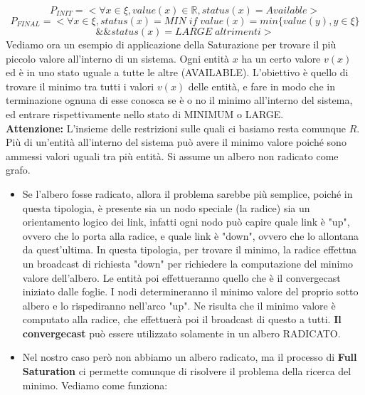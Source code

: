 $$P_{INIT} = < \forall x \in \xi, value(x) \in \mathbb{R}, status(x) =
    Available>$$
$$
    P_{FINAL} =   <
    \forall x \in \xi, status(x)= MIN \; if \; value(x) = min
    \{value(y), y \in \xi \}$$$$ \&\&  status(x) = LARGE \;altrimenti >$$
Vediamo ora un esempio di applicazione della Saturazione per trovare il più
piccolo valore all'interno di un sistema. Ogni entità $x$ ha un certo valore
$v(x)$ ed è in uno stato uguale a tutte le altre (AVAILABLE). L'obiettivo è
quello di trovare il minimo tra tutti i valori $v(x)$ delle entità, e fare in
modo che in terminazione ognuna di esse conosca se è o no il minimo all'interno
del sistema, ed entrare rispettivamente nello stato di MINIMUM o LARGE.\\
\textbf{Attenzione:} L'insieme delle restrizioni sulle quali ci basiamo resta
comunque $R$. Più di un'entità all'interno del sistema può avere il minimo
valore poiché sono ammessi valori uguali tra più entità. Si assume un albero non
radicato come grafo.\\
\begin{itemize}
    \item Se l'albero fosse radicato, allora il problema sarebbe più semplice,
          poiché in questa tipologia, è presente sia un nodo speciale (la radice) sia un
          orientamento logico dei link, infatti ogni nodo può capire quale link è "up",
          ovvero che lo porta alla radice, e quale link è "down", ovvero che lo
          allontana da quest'ultima. In questa tipologia, per trovare il minimo, la
          radice effettua un broadcast di richiesta "down" per richiedere la
          computazione del minimo valore dell'albero. Le entità poi effettueranno quello
          che è il convergecast iniziato dalle foglie. I nodi determineranno il minimo
          valore del proprio sotto albero e lo rispediranno nell'arco "up". Ne risulta
          che il minimo valore è computato alla radice, che effettuerà poi il broadcast
          di questo a tutti. \textbf{Il convergecast} può essere utilizzato solamente in
          un albero RADICATO.
    \item Nel nostro caso però non abbiamo un albero radicato, ma il processo di
          \textbf{Full Saturation} ci permette comunque di risolvere il problema della
          ricerca del minimo. Vediamo come funziona:
\end{itemize}

